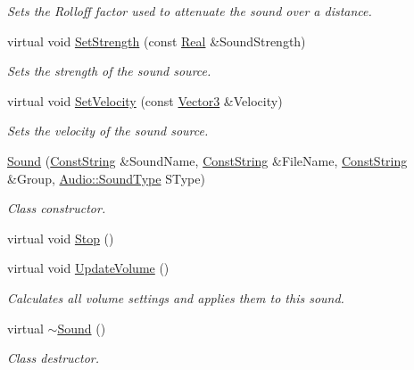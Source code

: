 \begin{DoxyCompactItemize}
\begin{DoxyCompactList}\small\item\em Sets the Rolloff factor used to attenuate the sound over a distance. \item\end{DoxyCompactList}\item 
virtual void \hyperlink{classMezzanine_1_1Audio_1_1Sound_a473e3e46141c95b3ace664d2174240d2}{SetStrength} (const \hyperlink{namespaceMezzanine_a726731b1a7df72bf3583e4a97282c6f6}{Real} \&SoundStrength)
\begin{DoxyCompactList}\small\item\em Sets the strength of the sound source. \item\end{DoxyCompactList}\item 
virtual void \hyperlink{classMezzanine_1_1Audio_1_1Sound_a1c987846b4e33b70266afea6e350a7fd}{SetVelocity} (const \hyperlink{classMezzanine_1_1Vector3}{Vector3} \&Velocity)
\begin{DoxyCompactList}\small\item\em Sets the velocity of the sound source. \item\end{DoxyCompactList}\item 
\hyperlink{classMezzanine_1_1Audio_1_1Sound_ad0739c73fe497ad407642da5597a7599}{Sound} (\hyperlink{namespaceMezzanine_a63cd699ac54b73953f35ec9cfc05e506}{ConstString} \&SoundName, \hyperlink{namespaceMezzanine_a63cd699ac54b73953f35ec9cfc05e506}{ConstString} \&FileName, \hyperlink{namespaceMezzanine_a63cd699ac54b73953f35ec9cfc05e506}{ConstString} \&Group, \hyperlink{namespaceMezzanine_1_1Audio_a316b2244b8be1a8c441a39b0a246295e}{Audio::SoundType} SType)
\begin{DoxyCompactList}\small\item\em Class constructor. \item\end{DoxyCompactList}\item 
virtual void \hyperlink{classMezzanine_1_1Audio_1_1Sound_a7c1d618d573b6176056c9255d06872b5}{Stop} ()
\item 
\hypertarget{classMezzanine_1_1Audio_1_1Sound_ab4d3ddd9aed1bdd3b9c4592f776d29ca}{
virtual void \hyperlink{classMezzanine_1_1Audio_1_1Sound_ab4d3ddd9aed1bdd3b9c4592f776d29ca}{UpdateVolume} ()}
\label{classMezzanine_1_1Audio_1_1Sound_ab4d3ddd9aed1bdd3b9c4592f776d29ca}

\begin{DoxyCompactList}\small\item\em Calculates all volume settings and applies them to this sound. \item\end{DoxyCompactList}\item 
virtual \hyperlink{classMezzanine_1_1Audio_1_1Sound_a2aed211bc488b29b38fef7c54c4a7952}{$\sim$Sound} ()
\begin{DoxyCompactList}\small\item\em Class destructor. \item\end{DoxyCompactList}\end{DoxyCompactItemize}
